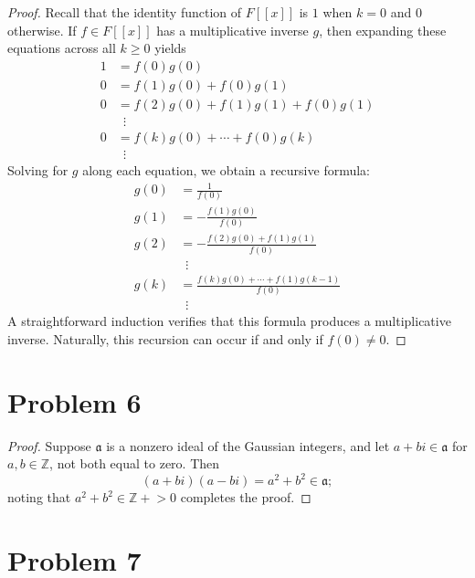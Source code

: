 \documentclass[11pt]{article}
\begin{document}
\begin{proof}
  Recall that the identity function of $F[[x]]$ is $1$ when $k = 0$ and $0$ otherwise. If $f \in F[[x]]$ has a multiplicative inverse $g$, then expanding these equations across all $k \ge 0$ yields
  \begin{align*}
   1 &= f(0)g(0)\\
   0 &= f(1)g(0) + f(0)g(1)  \\
   0 &= f(2)g(0) + f(1)g(1) + f(0)g(1) \\
     & \,\,\, \vdots \\
   0 &= f(k)g(0) + \cdots + f(0)g(k) \\
     & \, \, \, \vdots
  \end{align*}
  Solving for $g$ along each equation, we obtain a recursive formula:
  \begin{align*}
   g(0) &= \frac{1}{f(0)} \\
   g(1) &= - \frac{f(1)g(0)}{f(0)} \\
   g(2) &= - \frac{f(2)g(0) + f(1)g(1)}{f(0)} \\
        & \, \, \, \vdots \\
   g(k) &= \frac{f(k)g(0) + \cdots + f(1)g(k - 1)}{f(0)} \\
        & \, \, \, \vdots
  \end{align*}
  A straightforward induction verifies that this formula produces a multiplicative inverse. Naturally, this recursion can occur if and only if $\boxed{f(0) \ne 0}$.
\end{proof}


\section{Problem 6}

\begin{proof} 
  Suppose $\mathfrak{a}$ is a nonzero ideal of the Gaussian integers, and let $a + bi \in \mathfrak{a}$ for $a, b \in \mathbb{Z}$, not both equal to zero. Then
  \[
  	(a + bi)(a - bi) = a^{2} + b^{2} \in \mathfrak{a};
  \]
  noting that $a^{2} + b^{2} \in \mathbb{Z}+{> 0}$ completes the proof.
\end{proof}


\section{Problem 7}
\end{document}
